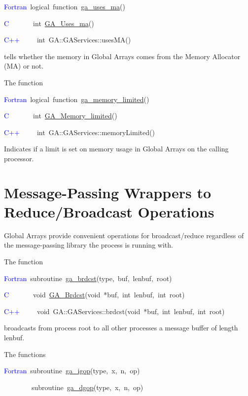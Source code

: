 \textcolor{blue}{Fortran}~logical~function~\href{https://hpc.pnl.gov/globalarrays/api/f_op_api.html\#ga_uses_ma}{ga\_{}uses\_{}ma}()~

\textcolor{blue}{C}~~~~~~~int~\href{https://hpc.pnl.gov/globalarrays/api/c_op_api.html\#ga_uses_ma}{GA\_{}Uses\_{}ma}()~

\textcolor{blue}{C++}~~~~~int~GA::GAServices::usesMA()

tells whether the memory in Global Arrays comes from the Memory Allocator
(MA) or not.

The function

\textcolor{blue}{Fortran}~logical~function~\href{https://hpc.pnl.gov/globalarrays/api/f_op_api.html\#ga_memory_limited}{ga\_{}memory\_{}limited}()~

\textcolor{blue}{C}~~~~~~~int~\href{https://hpc.pnl.gov/globalarrays/api/c_op_api.html\#ga_memory_limited}{GA\_{}Memory\_{}limited}()~

\textcolor{blue}{C++}~~~~~int~GA::GAServices::memoryLimited()

Indicates if a limit is set on memory usage in Global Arrays on the
calling processor. 


\section{Message-Passing Wrappers to Reduce/Broadcast Operations }

Global Arrays provide convenient operations for broadcast/reduce regardless
of the message-passing library the process is running with.

The function

\textcolor{blue}{Fortran}~subroutine~\href{https://hpc.pnl.gov/globalarrays/api/f_op_api.html\#ga_brdcst}{ga\_{}brdcst}(type,~buf,~lenbuf,~root)~

\textcolor{blue}{C}~~~~~~~void~\href{https://hpc.pnl.gov/globalarrays/api/c_op_api.html\#ga_brdcst}{GA\_{}Brdcst}(void~{*}buf,~int~lenbuf,~int~root)~

\textcolor{blue}{C++}~~~~~void~GA::GAServices::brdcst(void~{*}buf,~int~lenbuf,~int~root)

broadcasts from process root to all other processes a message buffer
of length lenbuf.

The functions

\textcolor{blue}{Fortran}~subroutine~\href{https://hpc.pnl.gov/globalarrays/api/f_op_api.html\#ga_igop}{ga\_{}igop}(type,~x,~n,~op)~

~~~~~~~~subroutine~\href{https://hpc.pnl.gov/globalarrays/api/f_op_api.html\#ga_igop}{ga\_{}dgop}(type,~x,~n,~op)~

